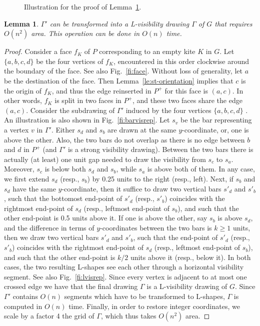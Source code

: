 \documentclass[a4paper]{article}
\newtheorem{lemma}{Lemma}
\begin{document}
\begin{figure}[t]
\centering
{}\hfil
{}\hfil
{}\hfil
\caption{\small Illustration for the proof of Lemma~\ref{le:drawing}.}
\end{figure}

\begin{lemma}\label{le:drawing}
$\Gamma'$ can be transformed into a L-visibility drawing $\Gamma$ of $G$ that requires $O(n^2)$ area. This operation can be done in $O(n)$ time.
\end{lemma}
\begin{proof}
Consider a face $f_K$ of $P$ corresponding to an empty kite $K$ in $G$. Let $\{a,b,c,d\}$ be the four vertices of $f_K$, encountered in this order clockwise around the boundary of the face. See also Fig.~\ref{fi:face}. Without loss of generality, let $a$ be the destination of the face. Then Lemma~\ref{le:st-orientation} implies that $c$ is the origin of $f_K$, and thus the edge reinserted in $P^+$ for this face is $(a,c)$. In other words, $f_K$ is split in two faces in $P^+$, and these two faces share the edge $(a,c)$. Consider the subdrawing of $\Gamma'$ induced by the four vertices $\{a,b,c,d\}$ . An illustration is also shown in Fig.~\ref{fi:barvisrep}. Let $s_v$ be the bar representing a vertex $v$ in $\Gamma'$. Either $s_d$ and $s_b$ are drawn at the same $y$-coordinate, or, one is above the other. Also, the two bars do not overlap as there is no edge between $b$ and $d$ in $P^+$ (and $\Gamma'$ is a strong visibility drawing). Between the two bars there is actually (at least) one unit gap needed to draw the visibility from $s_c$ to $s_a$. Moreover, $s_c$ is below both $s_d$ and $s_b$, while $s_a$ is above both of them. In any case, we first extend $s_d$ (resp., $s_b$) by 0.25 units to the right (resp., left). Next, if $s_b$ and $s_d$ have the same $y$-coordinate, then it suffice to draw two vertical bars $s'_d$ and $s'_b$, such that the bottomost end-point of $s'_d$ (resp., $s'_b$) coincides with the rightmost end-point of $s_d$ (resp., leftmost end-point of $s_b$), and such that the other end-point is 0.5 units above it.  If one is above the other, say $s_b$ is above $s_d$, and the difference in terms of $y$-coordinates between the two bars is $k\geq1$ units, then we draw two vertical bars $s'_d$ and $s'_b$, such that the end-point of $s'_d$ (resp., $s'_b$) coincides with the rightmost end-point of $s_d$ (resp., leftmost end-point of $s_b$), and such that the other end-point is $k/2$ units above it (resp., below it). In both cases, the two resulting L-shapes see each other through a horizontal visibility segment. See also Fig.~\ref{fi:lvisrep}. Since every vertex is adjacent to at most one crossed edge  we have that the final drawing $\Gamma$ is a L-visibility drawing of $G$. Since $\Gamma'$ contains $O(n)$ segments which have to be transformed to L-shapes, $\Gamma$ is computed in $O(n)$ time. Finally, in order to restore integer coordinates, we scale by a factor 4 the grid of $\Gamma$, which thus takes $O(n^2)$ area.

\end{proof}
\end{document}
